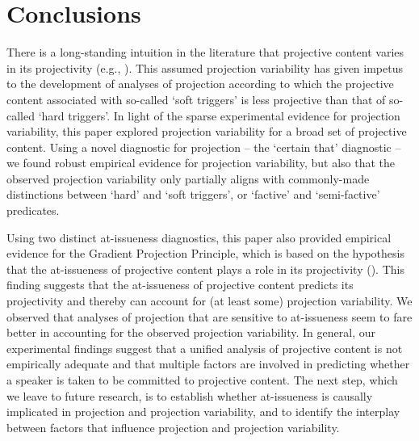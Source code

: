 \documentclass[11pt,fleqn]{article}
\newcommand{\6}{\mbox{$[\hspace*{-.6mm}[$}}
\newcommand{\9}{\mbox{$]\hspace*{-.6mm}]$}}
\begin{document}
\section{Conclusions}\label{s6}

There is a long-standing intuition in the literature that projective content varies in its projectivity (e.g., \citealt{karttunen71b,simons01,abusch10}). This assumed projection variability has given impetus to the development of analyses of projection according to which the projective content associated with so-called `soft triggers' is less projective than that of so-called `hard triggers'. In light of the sparse experimental evidence for projection variability, this paper explored projection variability for a broad set of projective content. Using a novel diagnostic for projection -- the `certain that' diagnostic -- we found robust empirical evidence for projection variability, but also that the observed projection variability only partially aligns with commonly-made distinctions between `hard' and `soft triggers', or `factive' and `semi-factive' predicates. 

Using two distinct at-issueness diagnostics, this paper also provided empirical evidence for the Gradient Projection Principle, which is based on the hypothesis that the at-issueness of projective content plays a role in its projectivity (\citealt{brst-salt10,brst-ar}). This finding suggests that the at-issueness of projective content predicts its projectivity and thereby can account for (at least some) projection variability. We observed that analyses of projection that are sensitive to at-issueness seem to fare better in accounting for the observed projection variability. In general, our experimental findings suggest that a unified analysis of projective content is not empirically adequate and that multiple factors are involved in predicting whether a speaker is taken to be committed to projective content. The next step, which we leave to future research, is to establish whether at-issueness is causally implicated in projection and projection variability, and to identify the interplay between factors that influence projection and projection variability.

\appendix

\setcounter{table}{0}
\renewcommand{\thetable}{A\arabic{table}}

\setcounter{figure}{0}
\renewcommand{\thefigure}{A\arabic{figure}}
\end{document}

